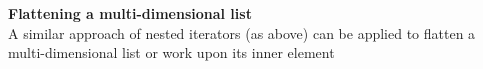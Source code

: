 {{{			\newpage
			
			\item \textbf{Flattening a multi-dimensional list} \\       
			A similar approach of nested iterators (as above) can be applied to flatten a multi-dimensional list or work upon its inner element
			
		}
		
	
	}
	
}    

  

